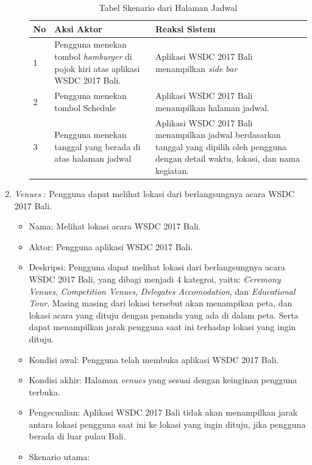 \begin{enumerate}
\begin{itemize}
\begin{table}[H]
			\centering
			\begin{tabular}{|p{0.5cm}|p{7cm}|p{7cm}|}
				\hline
				No & Aksi Aktor                               & Reaksi Sistem                                          \\ \hline
				1  & Pengguna menekan tombol {\it hamburger} di pojok kiri atas aplikasi WSDC 2017 Bali. & Aplikasi WSDC 2017 Bali menampilkan {\it side bar} \\ \hline
				2  & Pengguna menekan tombol Schedule & Aplikasi WSDC 2017 Bali menampilkan halaman jadwal. \\ \hline
				3  & Pengguna menekan tanggal yang berada di atas halaman jadwal & Aplikasi WSDC 2017 Bali menampilkan jadwal berdasarkan tanggal yang dipilih oleh pengguna dengan detail waktu, lokasi, dan nama kegiatan. \\ \hline
			\end{tabular}
			\caption{Tabel Skenario dari Halaman Jadwal}
			\label{table:skenarioHalamanJadwal}
		\end{table}
	\end{itemize}
	\item {\it Venues} : Pengguna dapat melihat lokasi dari berlangsungnya acara WSDC 2017 Bali.
	\begin{itemize}
		\item Nama: Melihat lokasi acara WSDC 2017 Bali.
		\item Aktor: Pengguna aplikasi WSDC 2017 Bali.
		\item Deskripsi: Pengguna dapat melihat lokasi dari berlangsungnya acara WSDC 2017 Bali, yang dibagi menjadi 4 kategroi, yaitu: {\it Ceremony Venues}, {\it Competition Venues}, {\it Delegates Accomodation}, dan {\it Educational Tour}. Masing masing dari lokasi tersebut akan menampikan peta, dan lokasi acara yang dituju dengan penanda yang ada di dalam peta. Serta dapat menampilkan jarak pengguna saat ini terhadap lokasi yang ingin dituju.
		\item Kondisi awal: Pengguna telah membuka aplikasi WSDC 2017 Bali.
		\item Kondisi akhir: Halaman {\it venues} yang sesuai dengan keinginan pengguna terbuka.
		\item Pengecualian: Aplikasi WSDC 2017 Bali tidak akan menampilkan jarak antara lokasi pengguna saat ini ke lokasi yang ingin dituju, jika pengguna berada di luar pulau Bali.
		\item Skenario utama: \\
		 \begin{table}[H]

\end{table}
\end{itemize}
\end{enumerate}
